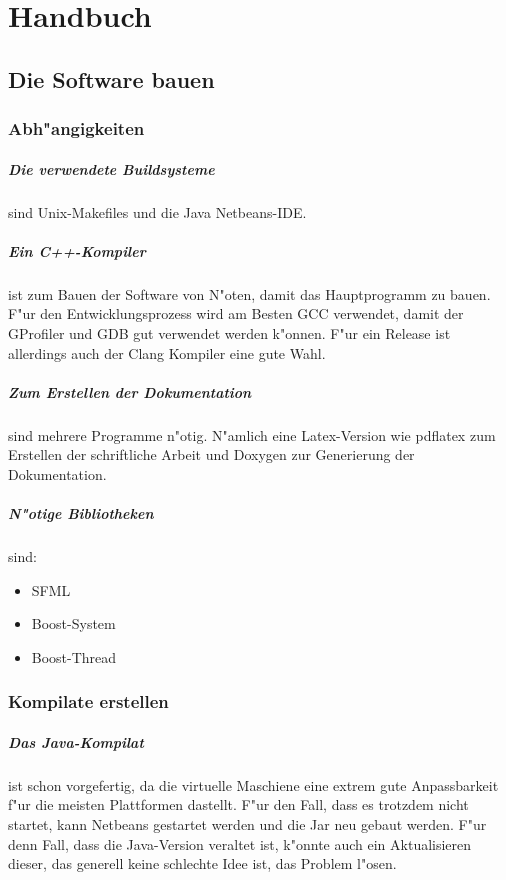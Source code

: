 \documentclass[14pt, a4paper]{report}
\begin{document}
\appendix
\chapter{Handbuch}
\tableofcontents
\section{Die Software bauen}

\subsection{Abh"angigkeiten}
\paragraph{Die verwendete Buildsysteme} sind Unix-Makefiles und die Java Netbeans-IDE.  
\paragraph{Ein C++-Kompiler} ist zum Bauen der Software von N"oten, damit das 
Hauptprogramm zu bauen. F"ur den Entwicklungsprozess wird am Besten GCC verwendet, damit
der GProfiler und GDB gut verwendet werden k"onnen. F"ur ein Release ist allerdings auch
der Clang Kompiler eine gute Wahl. 
\paragraph{Zum Erstellen der Dokumentation} sind mehrere Programme n"otig. N"amlich
eine Latex-Version wie pdflatex zum Erstellen der schriftliche Arbeit und Doxygen zur
Generierung der Dokumentation.
\paragraph{N"otige Bibliotheken} sind:
\begin{itemize}
\item SFML
\item Boost-System
\item Boost-Thread
\end{itemize}

\subsection{Kompilate erstellen}
\paragraph{Das Java-Kompilat} ist schon vorgefertig, da die virtuelle Maschiene eine 
extrem gute Anpassbarkeit f"ur die meisten Plattformen dastellt. F"ur den Fall, dass es
trotzdem nicht startet, kann Netbeans gestartet werden und die Jar neu gebaut werden.
F"ur denn Fall, dass die Java-Version veraltet ist, k"onnte auch ein Aktualisieren 
dieser, das generell keine schlechte Idee ist, das Problem l"osen.
\end{document}
